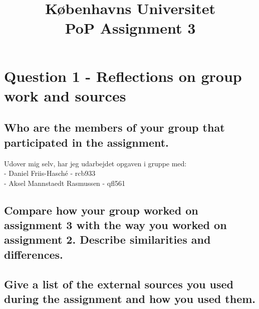 \documentclass[a4paper,12pt]{article}
\begin{document}
% 

\title{Københavns Universitet\\
PoP Assignment 3}
\maketitle %

\section{Question 1 - Reflections on group work and sources}

\subsection{Who are the members of your group that participated in the assignment.}
Udover mig selv, har jeg udarbejdet opgaven i gruppe med:\\
- Daniel Friis-Hasché - rcb933\\
- Aksel Mannstaedt Rasmussen - qfl561

\subsection{Compare how your group worked on assignment 3 with the way you worked on assignment 2. Describe similarities and differences.}

\subsection{Give a list of the external sources you used during the assignment and how you used them.}

\end{document}
